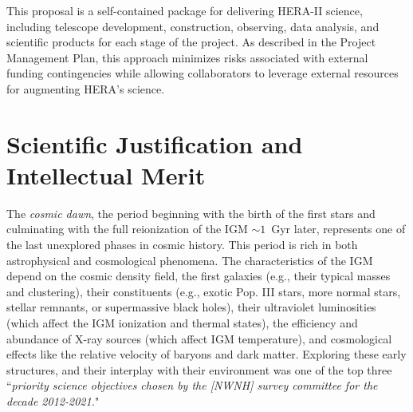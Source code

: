 \documentclass[preprint]{aastex}
\newcommand{\compress}{\vspace{-0.3in}}
\begin{document}
This proposal is a self-contained package for delivering HERA-II science,
including telescope development, construction, observing, data analysis,
and scientific products for each stage of the project.  As described
in the Project Management Plan, this approach minimizes
risks associated with external funding contingencies while allowing 
collaborators to leverage external resources for augmenting HERA's science.





\compress
\section{Scientific Justification and Intellectual Merit} %



The {\it cosmic dawn}, the period beginning with the birth of the first stars and culminating with the full
reionization of the IGM 
$\sim 1$~Gyr later, represents one of the last unexplored phases in cosmic history. 
This period is rich in both astrophysical and cosmological phenomena. 
The characteristics of the IGM depend on the cosmic density field, the first galaxies (e.g., their typical masses and 
clustering), their constituents (e.g., exotic Pop. III 
stars, more normal stars, stellar remnants, or supermassive black holes), their ultraviolet luminosities (which affect
the IGM ionization and thermal states), the efficiency and abundance of X-ray sources (which affect IGM temperature), 
and cosmological effects like the relative velocity of baryons and dark matter. 
Exploring these early structures, and their interplay with their environment was one of the top three ``{\it priority science objectives chosen by 
the [NWNH] survey committee for the decade 2012-2021.}"
\end{document}
